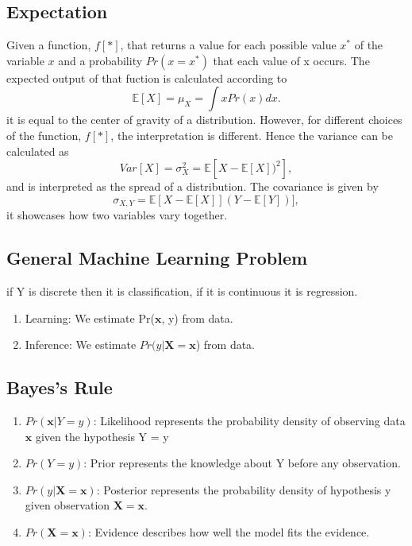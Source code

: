 \documentclass[12pt]{article}
\numberwithin{equation}{section}
\begin{document}
\subsection{Expectation}
Given a function, $f[*]$, that returns a value for each possible value $x^*$ of the variable $x$ and a probability $Pr(x = x^*)$ that each value of x occurs. The expected output of that fuction is calculated according to
\begin{equation}
    \mathbb{E}[X] = \mu_X = \int x Pr(x) dx.
\end{equation}
it is equal to the center of gravity of a distribution. However, for different choices of the function, $f[*]$, the interpretation is different. Hence the variance can be calculated as
\begin{equation}
    Var[X] = \sigma_X^2 = \mathbb{E}[X-\mathbb{E}[X])^2],
\end{equation}
and is interpreted as the spread of a distribution. The covariance is given by
\begin{equation}
    \sigma_{X,Y} = \mathbb{E}[X-\mathbb{E}[X]](Y-\mathbb{E}[Y])],
\end{equation}
it showcases how two variables vary together.
\subsection{General Machine Learning Problem}
if Y is discrete then it is classification, if it is continuous it is regression.
\begin{enumerate}
    \item Learning: We estimate Pr($\bm{x}$, y) from data.
    \item Inference: We estimate $Pr(y | \bm{X} = \bm{x}$) from data.
\end{enumerate}

\subsection{Bayes's Rule}
\begin{enumerate}
    \item $Pr(\bm{x} | Y = y)$: Likelihood represents the probability density of observing data $\bm{x}$ given the hypothesis Y = y
    \item $Pr(Y = y)$: Prior represents the knowledge about Y before any observation.
    \item $Pr(y | \bm{X} = \bm{x})$: Posterior represents the probability density of hypothesis y given observation $\bm{X} = \bm{x}$.
    \item $Pr(\bm{X} = \bm{x})$: Evidence describes how well the model fits the evidence.
\end{enumerate}
\end{document}
